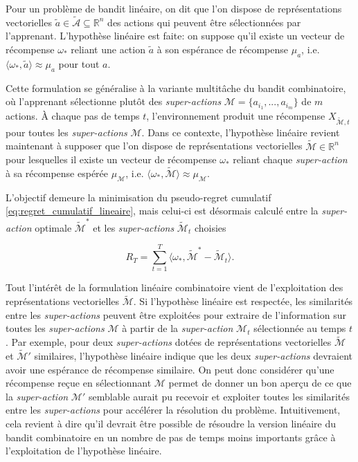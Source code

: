 Pour un problème de bandit linéaire, on dit que l'on dispose 
de représentations vectorielles $\tilde{a} \in \tilde{\mathcal{A}} \subseteq \mathbb{R}^n$
des actions qui peuvent être sélectionnées par l'apprenant.
L'hypothèse linéaire est faite: on suppose qu'il existe un vecteur de récompense $\omega_*$
reliant une action $\tilde{a}$ à son espérance de récompense $\mu_a$, i.e.
$\langle \omega_*, \tilde{a}\rangle \approx \mu_a$ pour tout $a$.

Cette formulation se généralise à la 
variante multitâche \citep{banditalgs} du bandit combinatoire, où l'apprenant 
sélectionne plutôt des \textit{super-actions} $\mathcal{M}=\{a_{i_1}, ..., a_{i_m}\}$
de $m$ actions.
À chaque pas de temps $t$, l'environnement produit une récompense $X_{\tilde{\mathcal{M}}, t}$ 
pour toutes les \textit{super-actions} $\mathcal{M}$.
Dans ce contexte, l'hypothèse linéaire revient maintenant 
à supposer que l'on dispose de représentations vectorielles 
$\tilde{\mathcal{M}} \in \mathbb{R}^n$ pour lesquelles il existe un 
vecteur de récompense $\omega_*$ reliant chaque \textit{super-action}
à sa récompense espérée $\mu_{\mathcal{M}}$, i.e. 
$\langle \omega_*, \tilde{\mathcal{M}} \rangle \approx \mu_{\mathcal{M}}$.

L'objectif demeure la minimisation du pseudo-regret cumulatif
\eqref{eq:regret_cumulatif_lineaire}, 
mais celui-ci est désormais calculé entre
la \textit{super-action} optimale $\tilde{\mathcal{M}}^*$ et les \textit{super-actions}
$\tilde{\mathcal{M}}_t$ choisies

\begin{equation}
    R_T = \sum_{t=1}^T \langle \omega_*, \tilde{\mathcal{M}}^* -\tilde{\mathcal{M}}_t \rangle.
    \label{eq:regret_combi_lineair}
\end{equation}

Tout l'intérêt de la formulation linéaire combinatoire vient de 
l'exploitation des représentations vectorielles $\tilde{\mathcal{M}}$.
Si l'hypothèse linéaire est respectée, les similarités 
entre les \textit{super-actions} peuvent être exploitées 
pour extraire de l'information sur toutes les \textit{super-actions}
$\mathcal{M}$ à partir de la \textit{super-action} $\mathcal{M}_t$
sélectionnée au temps $t$.
Par exemple, pour deux \textit{super-actions} dotées de représentations 
vectorielles $\tilde{\mathcal{M}}$ et $\tilde{\mathcal{M}}'$ 
similaires, l'hypothèse linéaire indique que les deux \textit{super-actions} devraient 
avoir une espérance de récompense similaire.
On peut donc considérer qu'une récompense reçue en sélectionnant 
$\mathcal{M}$ permet de donner un bon aperçu de ce que la \textit{super-action} 
$\mathcal{M}'$ semblable aurait pu recevoir et exploiter 
toutes les similarités entre les \textit{super-actions} pour accélérer
la résolution du problème.
Intuitivement, cela revient à dire qu'il devrait être possible 
de résoudre la version linéaire 
du bandit combinatoire en un nombre de pas de temps moins importants
grâce à l'exploitation de l'hypothèse linéaire.


